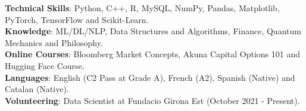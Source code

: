 \documentclass[11pt]{article}
\begin{document}
\hspace{}

\vspace{-0.7em}
\textbf{Technical Skills}: Python, C++, R, MySQL, NumPy, Pandas, Matplotlib, PyTorch, TensorFlow and Scikit-Learn.\\
\textbf{Knowledge}: ML/DL/NLP, Data Structures and Algorithms, Finance, Quantum Mechanics and Philosophy.\\
\textbf{Online Courses}: Bloomberg Market Concepts, Akuna Capital Options 101 and Hugging Face Course.\\
\textbf{Languages}: English (C2 Pass at Grade A), French (A2), Spanish (Native) and Catalan (Native).\\
\textbf{Volunteering}: Data Scientist at Fundacio Girona Est (October 2021 - Present).
\end{document}
